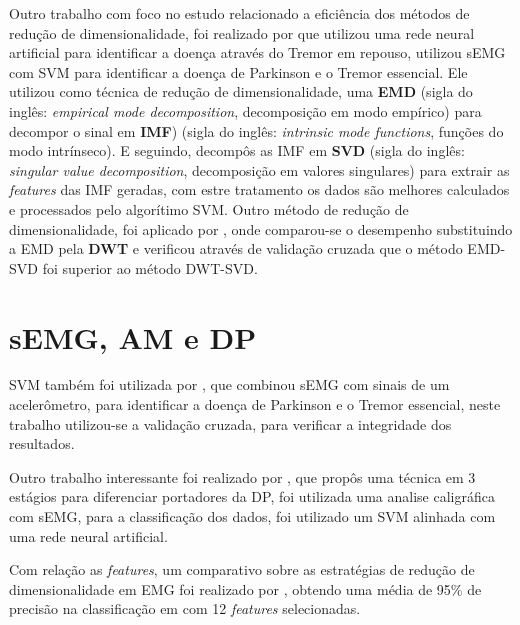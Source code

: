 Outro trabalho com foco no estudo relacionado a eficiência dos métodos de redução de dimensionalidade, foi realizado por  que utilizou uma rede neural artificial para identificar a doença através do Tremor em repouso,  utilizou sEMG com SVM para identificar a doença de Parkinson e o Tremor essencial. Ele utilizou como técnica de redução de dimensionalidade, uma \textbf{EMD} (sigla do inglês: \textit{empirical mode decomposition}, decomposição em modo empírico) para decompor o sinal em \textbf{IMF}) (sigla do inglês: \textit{intrinsic mode functions}, funções do modo intrínseco). E seguindo, decompôs as IMF em \textbf{SVD} (sigla do inglês: \textit{singular value decomposition}, decomposição em valores singulares) para extrair as \textit{features} das IMF geradas, com estre tratamento os dados são melhores calculados e processados pelo algorítimo SVM. Outro método de redução de dimensionalidade, foi aplicado por , onde comparou-se o desempenho substituindo a EMD pela \textbf{DWT} e verificou através de validação cruzada que o método EMD-SVD foi superior ao método DWT-SVD.

\section{sEMG, AM e DP}
SVM também foi utilizada por \cite{kugler2013automated}, que combinou sEMG com sinais de um acelerômetro, para identificar a doença de Parkinson e o Tremor essencial, neste trabalho utilizou-se a validação cruzada, para verificar a integridade dos resultados.

Outro trabalho interessante foi realizado por \cite{loconsole2018model}, que propôs uma técnica em 3 estágios para diferenciar portadores da DP, foi utilizada uma analise caligráfica com sEMG, para a classificação dos dados, foi utilizado um SVM alinhada com uma rede neural artificial.

Com relação as \textit{features}, um comparativo sobre as estratégias de redução de dimensionalidade em EMG foi realizado por \cite{liu2014feature}, obtendo uma média de 95\% de precisão na classificação em com 12 \textit{features} selecionadas. 